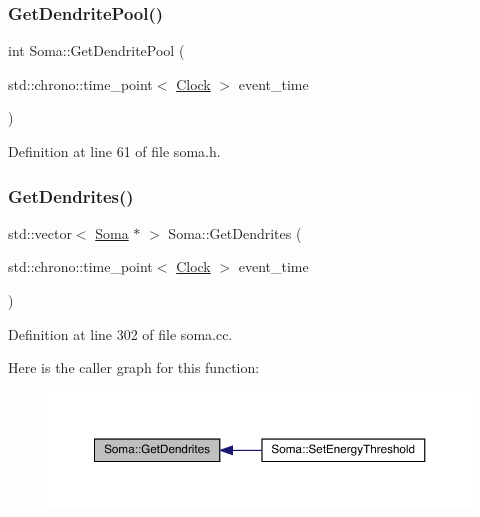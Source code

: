 \subsubsection{\texorpdfstring{Get\+Dendrite\+Pool()}{GetDendritePool()}}
{\footnotesize\ttfamily int Soma\+::\+Get\+Dendrite\+Pool (\begin{DoxyParamCaption}\item[{std\+::chrono\+::time\+\_\+point$<$ \hyperlink{universe_8h_a0ef8d951d1ca5ab3cfaf7ab4c7a6fd80}{Clock} $>$}]{event\+\_\+time }\end{DoxyParamCaption})\hspace{0.3cm}{\ttfamily [inline]}}



Definition at line 61 of file soma.\+h.

\mbox{\label{class_soma_afdb0e40855f31f2d9a48f3b13c01b599}} 
\subsubsection{\texorpdfstring{Get\+Dendrites()}{GetDendrites()}}
{\footnotesize\ttfamily std\+::vector$<$ \hyperlink{class_soma}{Soma} $\ast$ $>$ Soma\+::\+Get\+Dendrites (\begin{DoxyParamCaption}\item[{std\+::chrono\+::time\+\_\+point$<$ \hyperlink{universe_8h_a0ef8d951d1ca5ab3cfaf7ab4c7a6fd80}{Clock} $>$}]{event\+\_\+time }\end{DoxyParamCaption})}



Definition at line 302 of file soma.\+cc.

Here is the caller graph for this function\+:
\nopagebreak
\begin{figure}[H]
\begin{center}
\leavevmode
\includegraphics[width=350pt]{class_soma_afdb0e40855f31f2d9a48f3b13c01b599_icgraph}
\end{center}
\end{figure}
\mbox{\label{class_soma_a91dca73d2f5f97247cae0217a8c1440a}} 
